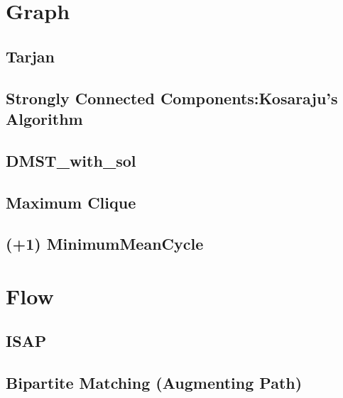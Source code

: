 \documentclass[10pt,twocolumn,oneside]{article}
\begin{document}
\section{Graph}

\subsection{Tarjan}


\subsection{Strongly Connected Components:Kosaraju's Algorithm}


%

\subsection{DMST\_with\_sol}


\subsection{Maximum Clique}


\subsection{(+1) MinimumMeanCycle}


\section{Flow}
\subsection{ISAP} %


\subsection{Bipartite Matching (Augmenting Path)}

\end{document}
